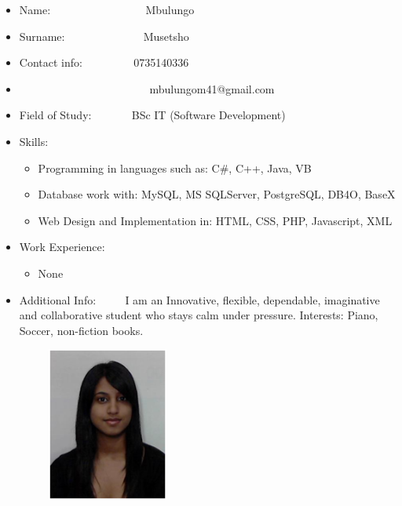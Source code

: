 \documentclass[12pt]{article}
\begin{document}
\begin{itemize}
\item Name: \ ~~~~~~~~~~~~~~ \ Mbulungo
\item Surname: \ ~~~~~~~~~~~ \ Musetsho
\item Contact info: \ ~~~~~~ \ 0735140336
\item \ ~~~~~~~~~~~~~~~~~~~~~ \ mbulungom41@gmail.com
\item Field of Study: \ ~~~~ \ BSc IT (Software Development)
\item Skills: 	\begin{itemize}
					\item Programming in languages such as: C\#, C++, Java, VB
					\item Database work with: MySQL, MS SQLServer, PostgreSQL, DB4O, BaseX
					\item Web Design and Implementation in: HTML, CSS, PHP, Javascript, XML
				\end{itemize}
\item Work Experience: 	\begin{itemize}
							\item None
						\end{itemize}
\item Additional Info: \ ~~ \ I am an Innovative,  flexible, dependable, imaginative and collaborative student who stays calm under pressure. Interests: Piano, Soccer, non-fiction books.
\end{itemize}

\newpage 
\begin{figure}[ht!]
	\centering
	\includegraphics[width=2in, height=2in]{./Pictures/Verushka.jpg}
\end{figure}
\end{document}
